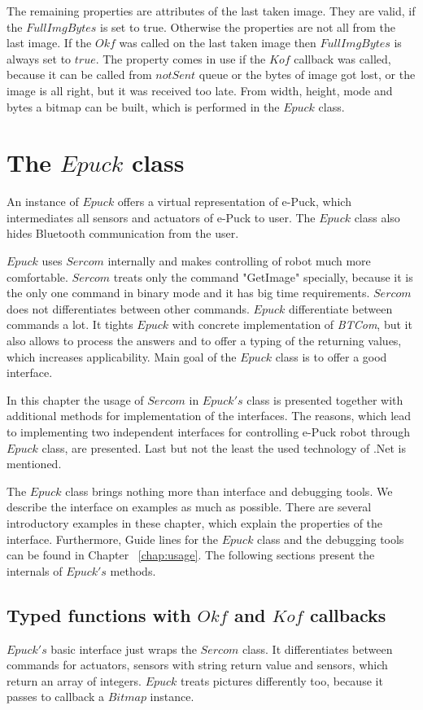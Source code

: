   The remaining properties are attributes of the last taken image. They are valid, if the $FullImgBytes$ is set to true.
  Otherwise the properties are not all from the last image.
  If the $Okf$ was called on the last taken image then $FullImgBytes$ is always set to $true$. The property
  comes in use if the $Kof$ callback was called, because it can be called from $notSent$ queue 
  or the bytes of image got lost, or the image is all right, but it was received too late. 
  From width, height, mode and bytes a bitmap can be built, which is performed
  in the $Epuck$ class.

\section{The $Epuck$ class} \label{sec:epuck}
  An instance of $Epuck$ offers a virtual representation of e-Puck,
  which intermediates all sensors and actuators of e-Puck to user. 
  The $Epuck$ class also hides Bluetooth communication from the user.

  $Epuck$ uses $Sercom$ internally and makes controlling of robot much more comfortable.
  $Sercom$ treats only the command "GetImage" specially, because it is the only one command in binary mode
  and it has big time requirements. $Sercom$ does not differentiates between other commands.
  $Epuck$ differentiate between commands a lot. It tights $Epuck$ with concrete implementation of {\it BTCom},
  but it also allows to process the answers and to offer a typing of the returning values, which increases
  applicability. Main goal of the $Epuck$ class is to offer a good interface.

  In this chapter the usage of $Sercom$ in $Epuck's$ class is presented together with additional methods 
  for implementation of the interfaces. The reasons, which lead to implementing two independent interfaces for
  controlling e-Puck robot through $Epuck$ class, are presented.
  Last but not the least the used technology of .Net is mentioned.

  The $Epuck$ class brings nothing more than interface and debugging tools. We describe the interface
  on examples as much as possible. There are several introductory examples in these chapter,
  which explain the properties of the interface. Furthermore, 
  Guide lines for the $Epuck$ class and the debugging
  tools can be found in Chapter ~\ref{chap:usage}.
  The following sections present the internals of $Epuck's$ methods.
  
\subsection{Typed functions with $Okf$ and $Kof$ callbacks} \label{sec:okfkofi}
  $Epuck's$ basic interface just wraps the $Sercom$ class. It differentiates between
  commands for actuators, sensors with string return value and sensors, which return an array of integers.
  $Epuck$ treats pictures differently too, because it passes to callback a $Bitmap$ instance.


